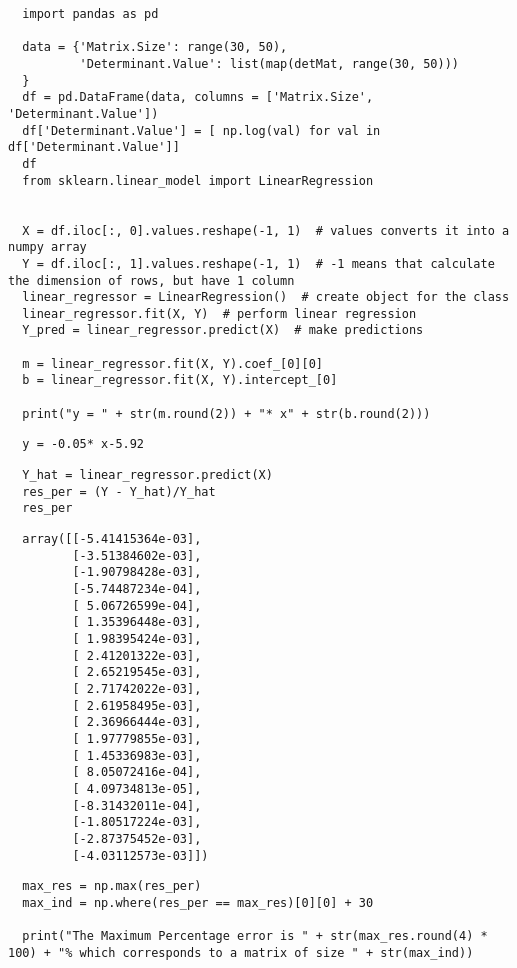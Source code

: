 \documentclass[11pt]{article}
\begin{document}
\begin{verbatim}
  import pandas as pd

  data = {'Matrix.Size': range(30, 50),
          'Determinant.Value': list(map(detMat, range(30, 50)))
  }
  df = pd.DataFrame(data, columns = ['Matrix.Size', 'Determinant.Value'])
  df['Determinant.Value'] = [ np.log(val) for val in df['Determinant.Value']]
  df
  from sklearn.linear_model import LinearRegression


  X = df.iloc[:, 0].values.reshape(-1, 1)  # values converts it into a numpy array
  Y = df.iloc[:, 1].values.reshape(-1, 1)  # -1 means that calculate the dimension of rows, but have 1 column
  linear_regressor = LinearRegression()  # create object for the class
  linear_regressor.fit(X, Y)  # perform linear regression
  Y_pred = linear_regressor.predict(X)  # make predictions

  m = linear_regressor.fit(X, Y).coef_[0][0]
  b = linear_regressor.fit(X, Y).intercept_[0]

  print("y = " + str(m.round(2)) + "* x" + str(b.round(2)))

\end{verbatim}

\begin{verbatim}
  y = -0.05* x-5.92
\end{verbatim}

\begin{verbatim}
  Y_hat = linear_regressor.predict(X)
  res_per = (Y - Y_hat)/Y_hat
  res_per
\end{verbatim}

\begin{verbatim}
  array([[-5.41415364e-03],
         [-3.51384602e-03],
         [-1.90798428e-03],
         [-5.74487234e-04],
         [ 5.06726599e-04],
         [ 1.35396448e-03],
         [ 1.98395424e-03],
         [ 2.41201322e-03],
         [ 2.65219545e-03],
         [ 2.71742022e-03],
         [ 2.61958495e-03],
         [ 2.36966444e-03],
         [ 1.97779855e-03],
         [ 1.45336983e-03],
         [ 8.05072416e-04],
         [ 4.09734813e-05],
         [-8.31432011e-04],
         [-1.80517224e-03],
         [-2.87375452e-03],
         [-4.03112573e-03]])
\end{verbatim}

\begin{verbatim}
  max_res = np.max(res_per)
  max_ind = np.where(res_per == max_res)[0][0] + 30

  print("The Maximum Percentage error is " + str(max_res.round(4) * 100) + "% which corresponds to a matrix of size " + str(max_ind))
\end{verbatim}
\end{document}
